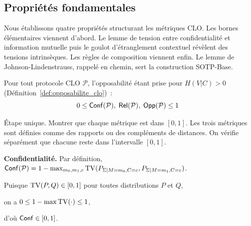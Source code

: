 \subsection{Propri\'et\'es fondamentales}
\label{subsec:proprietes_fondamentales}
\begin{sloppypar}
Nous \'etablissons quatre propri\'et\'es structurant les m\'etriques CLO. Les
bornes \'el\'ementaires viennent d'abord. Le lemme de tension entre confidentialit\'e
et information mutuelle puis le goulot d'\'etranglement contextuel r\'ev\`elent des
tensions intrins\`eques. Les r\`egles de composition viennent enfin. Le lemme de
Johnson-Lindenstrauss, rappel\'e en chemin, sert la construction SOTP-Base.

\begin{theorem}\label{thm:bornes_mesures}
Pour tout protocole CLO $\mathcal{P}$, l'opposabilit\'e \'etant prise pour
$H(V|C) > 0$ (D\'efinition~\ref{def:opposabilite_clo})~:
\begin{equation}
  0 \leq \mathsf{Conf}(\mathcal{P}),\; \mathsf{Rel}(\mathcal{P}),\; \mathsf{Opp}(\mathcal{P}) \leq 1
  \label{eq:bornes_elementaires}
\end{equation}
\end{theorem}

\begin{Preuve}\label{prv:bornes_mesures}

\begin{cmtEtape}{\'Etape unique. Montrer que chaque m\'etrique est dans $[0,1]$.}
Les trois m\'etriques sont d\'efinies comme des rapports ou des
compl\'ements de distances. On v\'erifie s\'epar\'ement que chacune
reste dans l'intervalle $[0,1]$.
\end{cmtEtape}

\textbf{Confidentialit\'e.}
Par d\'efinition, $\mathsf{Conf}(\mathcal{P}) = 1 - \max_{m_0,m_1,c}
\operatorname{TV}(P_{\Sigma|M=m_0,C=c}, P_{\Sigma|M=m_1,C=c})$.

Puisque $\operatorname{TV}(P,Q) \in [0,1]$ pour toutes distributions $P$ et $Q$,

on a $0 \leq 1 - \max \operatorname{TV}(\cdot) \leq 1$,

d'o\`u $\mathsf{Conf} \in [0,1]$.


\end{Preuve}
\end{sloppypar}
